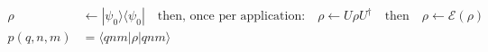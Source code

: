 \documentclass[12pt]{article}
\begin{document}
\fontsize{22}{28}\selectfont
\begin{align*}
\rho &\leftarrow |\psi_0\rangle\langle\psi_0|
      \quad\text{then, once per application:}
      \quad \rho\leftarrow U\rho U^\dagger
      \quad\text{then}\quad \rho\leftarrow\mathcal{E}(\rho) \\[0.55em]
p(q,n,m) &= \langle qnm|\rho|qnm\rangle
\end{align*}
\end{document}
